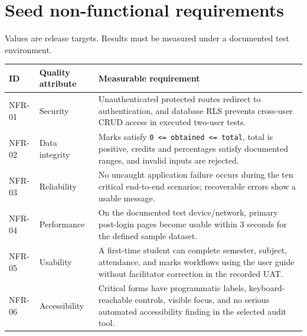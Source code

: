 \documentclass[
  10pt,
  a4paper,
  oneside]{report}
\newcounter{none} %
\begin{document}
\section{Seed non-functional
requirements}\label{143-seed-non-functional-requirements}

Values are release targets. Results must be measured under a documented
test environment.

{\def\LTcaptype{none} %
\begin{longtable}[]{@{}
  >{\raggedright\arraybackslash}p{}
  >{\raggedright\arraybackslash}p{}
  >{\raggedright\arraybackslash}p{}@{}}
\toprule\noalign{}
\begin{minipage}[b]{\linewidth}\raggedright
ID
\end{minipage} & \begin{minipage}[b]{\linewidth}\raggedright
Quality attribute
\end{minipage} & \begin{minipage}[b]{\linewidth}\raggedright
Measurable requirement
\end{minipage} \\
\midrule\noalign{}
\endhead
\bottomrule\noalign{}
\endlastfoot
NFR-01 & Security & Unauthenticated protected routes redirect to
authentication, and database RLS prevents cross-user CRUD access in
executed two-user tests. \\
NFR-02 & Data integrity & Marks satisfy
\texttt{0\ \textless{}=\ obtained\ \textless{}=\ total}, total is
positive, credits and percentages satisfy documented ranges, and invalid
inputs are rejected. \\
NFR-03 & Reliability & No uncaught application failure occurs during the
ten critical end-to-end scenarios; recoverable errors show a usable
message. \\
NFR-04 & Performance & On the documented test device/network, primary
post-login pages become usable within 3 seconds for the defined sample
dataset. \\
NFR-05 & Usability & A first-time student can complete semester,
subject, attendance, and marks workflows using the user guide without
facilitator correction in the recorded UAT. \\
NFR-06 & Accessibility & Critical forms have programmatic labels,
keyboard-reachable controls, visible focus, and no serious automated
accessibility finding in the selected audit tool. \\

\end{longtable}}
\end{document}
